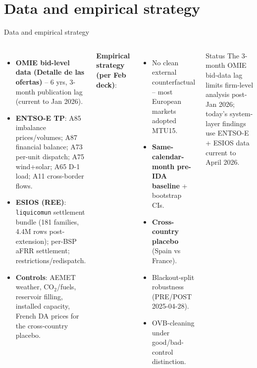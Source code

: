 \documentclass[aspectratio=169,10pt]{beamer}
\begin{document}
\section{Data and empirical strategy}

\begin{frame}{Data and empirical strategy}
\begin{columns}[T]
\begin{itemize}
  \item \textbf{OMIE bid-level data (Detalle de las ofertas)} -- 6 yrs, 3-month publication lag (current to Jan 2026).
  \item \textbf{ENTSO-E TP}: A85 imbalance prices/volumes; A87 financial balance; A73 per-unit dispatch; A75 wind+solar; A65 D-1 load; A11 cross-border flows.
  \item \textbf{ESIOS (REE)}: \texttt{liquicomun} settlement bundle (181 families, 4.4M rows post-extension); per-BSP aFRR settlement; restrictions/redispatch.
  \item \textbf{Controls}: AEMET weather, CO$_2$/fuels, reservoir filling, installed capacity, French DA prices for the cross-country placebo.
\end{itemize}

\textbf{Empirical strategy (per Feb deck)}:
\begin{itemize}
  \item No clean external counterfactual -- most European markets adopted MTU15.
  \item \textbf{Same-calendar-month pre-IDA baseline} + bootstrap CIs.
  \item \textbf{Cross-country placebo} (Spain vs France).
  \item Blackout-split robustness (PRE/POST 2025-04-28).
  \item OVB-cleaning under good/bad-control distinction.
\end{itemize}

\vspace{0.4em}
\begin{block}{Status}
\footnotesize
The 3-month OMIE bid-data lag limits firm-level analysis post-Jan 2026; today's system-layer findings use ENTSO-E + ESIOS data current to April 2026.
\end{block}
\end{columns}
\end{frame}
\end{document}

